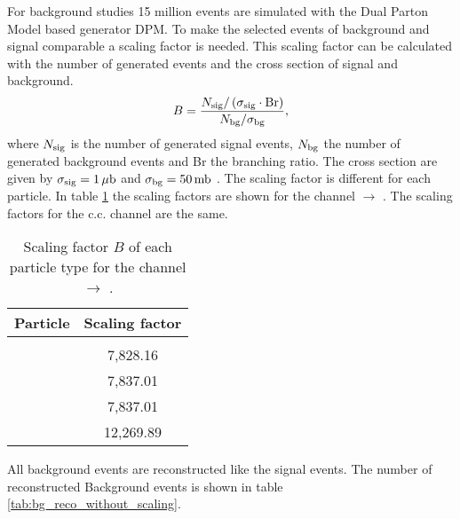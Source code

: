 For background studies 15 million events are simulated with the Dual Parton Model based generator DPM.
To make the selected events of background and signal comparable a scaling factor is needed.
This scaling factor can be calculated with the number of generated events and the cross section of signal and background.
\begin{equation}
		B = \frac{N_{\textnormal{sig}}/\left(\sigma_{\textnormal{sig}} \cdot \textnormal{Br}\right)}{N_{\textnormal{bg}}/\sigma_{\textnormal{bg}}},
\label{eq:bg_scaling}
\end{equation}
where $N_{\textnormal{sig}}$ is the number of generated signal events, $N_{\textnormal{bg}}$ the number of generated background events and Br the 
branching ratio. The cross section are given by $\sigma_{\textnormal{sig}} = 1\,\mu\textnormal{b}$ and $\sigma_{\textnormal{bg}} = 50\, \textnormal{mb}$ \cite{PANDAphysics2009}.
The scaling factor is different for each particle.
In table \ref{tab:bg_scaling} the scaling factors are shown for the channel \pbarpSystem $\rightarrow$ \excitedcascade \anticascade.
The scaling factors for the c.c. channel are the same. 

\begin{table}
	\centering
	\caption{Scaling factor $B$ of each particle type for the channel \pbarpSystem $\rightarrow$ \excitedcascade \anticascade.}
	\label{tab:bg_scaling}
	\begin{tabular}{cc}
		\hline
		 Particle & Scaling factor \\
		\hline
		\hline
		&  \\
		\lam & 7,828.16\\
		\anticascade & 7,837.01 \\
		\excitedcascade & 7,837.01\\
		\excitedcascade \anticascade & 12,269.89\\
		\hline
		 
	 \end{tabular}
\end{table}

All background events are reconstructed like the signal events. 
The number of reconstructed Background events is shown in table \ref{tab:bg_reco_without_scaling}.

